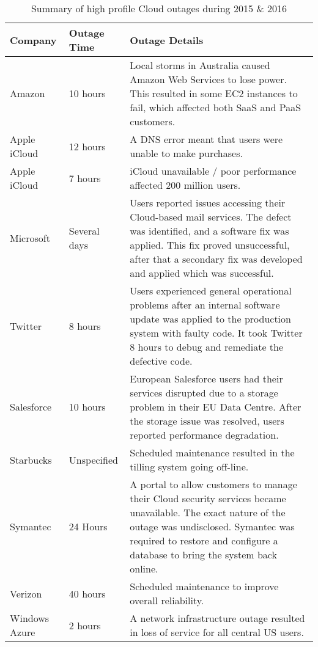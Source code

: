 \begin {table}
\begin{flushleft}
\caption {Summary of high profile Cloud outages during 2015 \& 2016}
\label{tab:chap2tab1}
\begin{tabular}{| C{2.6cm} | C{2.8cm} | L{7cm} |} \hline
\textbf{Company} & \textbf{Outage Time} & \textbf{Outage Details} 
\\ \hline Amazon & 10 hours  & Local storms in Australia caused Amazon Web Services to lose power. This resulted in some EC2 instances to fail, which affected both SaaS and PaaS customers. 
\\ \hline  Apple iCloud & 12 hours & A DNS error meant that users were unable to make purchases.
\\ \hline Apple iCloud    & 7 hours & iCloud unavailable / poor performance affected 200 million users.
\\ \hline Microsoft & Several days & Users reported issues accessing their Cloud-based mail services. The defect was identified, and a software fix was applied. This fix proved unsuccessful, after that a secondary fix was developed and applied which was successful.
\\ \hline Twitter & 8 hours  & Users experienced general operational problems after an internal software update was applied to the production system with faulty code. It took Twitter 8 hours to debug and remediate the defective code.
\\  \hline Salesforce & 10 hours  &  European Salesforce users had their services disrupted due to a storage problem in their EU Data Centre. After the storage issue was resolved, users reported performance degradation.
\\ \hline  Starbucks & Unspecified &  Scheduled maintenance resulted in the tilling system going off-line.
\\  \hline Symantec & 24 Hours  &  A portal to allow customers to manage their Cloud security services became unavailable. The exact nature of the outage was undisclosed. Symantec was required to restore and configure a database to bring the system back online.
\\ \hline Verizon    & 40 hours & Scheduled maintenance to improve overall reliability.
\\ \hline  Windows Azure & 2 hours & A network infrastructure outage resulted in loss of service for all central US users.
\\ \hline 
\end{tabular}
\end{flushleft}
\end{table}

